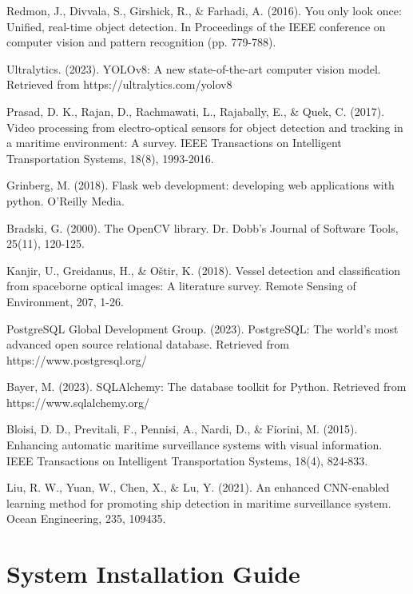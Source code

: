 \documentclass[12pt,a4paper]{report}
\begin{document}
\begin{thebibliography}{99}

Redmon, J., Divvala, S., Girshick, R., \& Farhadi, A. (2016). You only look once: Unified, real-time object detection. In Proceedings of the IEEE conference on computer vision and pattern recognition (pp. 779-788).

Ultralytics. (2023). YOLOv8: A new state-of-the-art computer vision model. Retrieved from https://ultralytics.com/yolov8

Prasad, D. K., Rajan, D., Rachmawati, L., Rajabally, E., \& Quek, C. (2017). Video processing from electro-optical sensors for object detection and tracking in a maritime environment: A survey. IEEE Transactions on Intelligent Transportation Systems, 18(8), 1993-2016.

Grinberg, M. (2018). Flask web development: developing web applications with python. O'Reilly Media.

Bradski, G. (2000). The OpenCV library. Dr. Dobb's Journal of Software Tools, 25(11), 120-125.

Kanjir, U., Greidanus, H., \& Oštir, K. (2018). Vessel detection and classification from spaceborne optical images: A literature survey. Remote Sensing of Environment, 207, 1-26.

PostgreSQL Global Development Group. (2023). PostgreSQL: The world's most advanced open source relational database. Retrieved from https://www.postgresql.org/

Bayer, M. (2023). SQLAlchemy: The database toolkit for Python. Retrieved from https://www.sqlalchemy.org/

Bloisi, D. D., Previtali, F., Pennisi, A., Nardi, D., \& Fiorini, M. (2015). Enhancing automatic maritime surveillance systems with visual information. IEEE Transactions on Intelligent Transportation Systems, 18(4), 824-833.

Liu, R. W., Yuan, W., Chen, X., \& Lu, Y. (2021). An enhanced CNN-enabled learning method for promoting ship detection in maritime surveillance system. Ocean Engineering, 235, 109435.

\end{thebibliography}

\appendix

\chapter{System Installation Guide}
\end{document}

